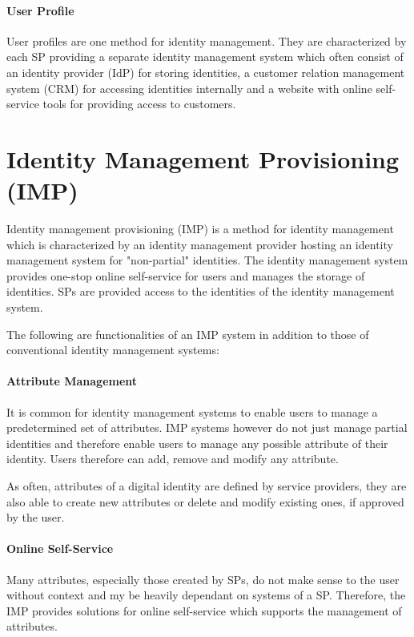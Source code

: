 \documentclass[
     12pt,         %
     a4paper,      %
     BCOR=10mm,version=first,     %
     DIV=14,version=first,        %
     ]{scrreprt}
\begin{document}
\paragraph{User Profile}
User profiles are one method for identity management. They are characterized by each SP providing a separate identity management system which often consist of an identity provider (IdP) for storing identities, a customer relation management system (CRM) for accessing identities internally and a website with online self-service tools for providing access to customers.

\section{Identity Management Provisioning (IMP)}
Identity management provisioning (IMP) is a method for identity management which is characterized by an identity management provider hosting an identity management system for "non-partial" identities. The identity management system provides one-stop online self-service for users and manages the storage of identities. SPs are provided access to the identities of the identity management system.

The following are functionalities of an IMP system in addition to those of conventional identity management systems:

\paragraph{Attribute Management}
It is common for identity management systems to enable users to manage a predetermined set of attributes. IMP systems however do not just manage partial identities and therefore enable users to manage any possible attribute of their identity. Users therefore can add, remove and modify any attribute.

As often, attributes of a digital identity are defined by service providers, they are also able to create new attributes or delete and modify existing ones, if approved by the user. 

\paragraph{Online Self-Service}
Many attributes, especially those created by SPs, do not make sense to the user without context and my be heavily dependant on systems of a SP. Therefore, the IMP provides solutions for online self-service which supports the management of attributes.
\end{document}

